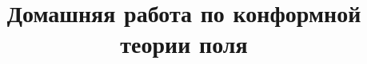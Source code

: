 \documentclass[a4paper]{article}
\title{Домашняя работа по конформной теории поля}
\begin{document}
	\maketitle
\begin{hiProb}[Упражнение 1]
\end{hiProb}
\end{document}
